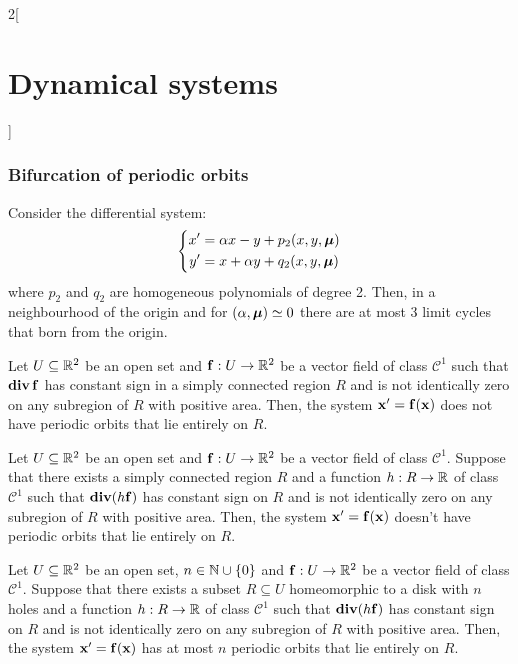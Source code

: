 \documentclass[../../../main_math.tex]{subfiles}
\begin{document}
\begin{multicols}{2}[\section{Dynamical systems}]
  \subsubsection{Bifurcation of periodic orbits}
  \begin{proposition}
    Consider the differential system:
    \begin{equation}\label{DS_eqhopf}
      \left\{
      \begin{aligned}
        x' & =\alpha x-y + p_2(x,y,\boldsymbol{\mathrm{\mu}}) \\
        y' & =x+ \alpha y +q_2(x,y,\boldsymbol{\mathrm{\mu}})
      \end{aligned}
      \right.
    \end{equation}
    where $p_2$ and $q_2$ are homogeneous polynomials of degree 2. Then, in a neighbourhood of the origin and for $(\alpha,\boldsymbol{\mathrm{\mu}})\simeq 0$ there are at most 3 limit cycles that born from the origin.
  \end{proposition}
  \begin{theorem}
    Let $U\subseteq \mathbb{R}^2$ be an open set and $\boldsymbol{\mathrm{f}}:U\rightarrow\mathbb{R}^2$ be a vector field of class $\mathcal{C}^1$ such that $\operatorname{\boldsymbol{\mathrm{div}}} \boldsymbol{\mathrm{f}}$ has constant sign in a simply connected region $R$ and is not identically zero on any subregion of $R$ with positive area. Then, the system $\boldsymbol{\mathrm{x}}'=\boldsymbol{\mathrm{f}}(\boldsymbol{\mathrm{x}})$ does not have periodic orbits that lie entirely on $R$.
  \end{theorem}
  \begin{theorem}
    Let $U\subseteq \mathbb{R}^2$ be an open set and $\boldsymbol{\mathrm{f}}:U\rightarrow\mathbb{R}^2$ be a vector field of class $\mathcal{C}^1$. Suppose that there exists a simply connected region $R$ and a function $h:R\rightarrow\mathbb{R}$ of class $\mathcal{C}^1$ such that $\operatorname{\boldsymbol{\mathrm{div}}} (h\boldsymbol{\mathrm{f}})$ has constant sign on $R$ and is not identically zero on any subregion of $R$ with positive area. Then, the system $\boldsymbol{\mathrm{x}}'=\boldsymbol{\mathrm{f}}(\boldsymbol{\mathrm{x}})$ doesn't have periodic orbits that lie entirely on $R$.
  \end{theorem}
  \begin{theorem}
    Let $U\subseteq \mathbb{R}^2$ be an open set, $n\in\mathbb{N}\cup\{0\}$ and $\boldsymbol{\mathrm{f}}:U\rightarrow\mathbb{R}^2$ be a vector field of class $\mathcal{C}^1$. Suppose that there exists a subset $R\subseteq U$ homeomorphic to a disk with $n$ holes and a function $h:R\rightarrow\mathbb{R}$ of class $\mathcal{C}^1$ such that $\operatorname{\boldsymbol{\mathrm{div}}} (h\boldsymbol{\mathrm{f}})$ has constant sign on $R$ and is not identically zero on any subregion of $R$ with positive area. Then, the system $\boldsymbol{\mathrm{x}}'=\boldsymbol{\mathrm{f}}(\boldsymbol{\mathrm{x}})$ has at most $n$ periodic orbits that lie entirely on $R$.

\end{theorem}
\end{multicols}
\end{document}

